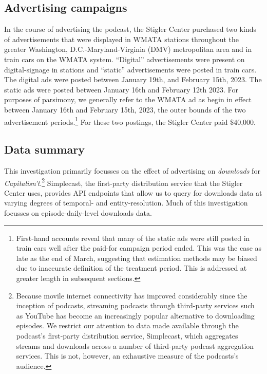 \documentclass[11pt, letterpaper, twoside]{article}
\begin{document}
\subsection{Advertising campaigns}
In the course of advertising the podcast, the Stigler Center purchased two kinds of advertisements that were displayed in WMATA stations throughout the greater Washington, D.C.-Maryland-Virginia (DMV) metropolitan area and in train cars on the WMATA system. ``Digital'' advertisements were present on digital-signage in stations and ``static'' advertisements were posted in train cars. The digital ads were posted between January 19th, and February 15th, 2023. The static ads were posted between January 16th and February 12th 2023. For purposes of parsimony, we generally refer to the WMATA ad as begin in effect between January 16th and February 15th, 2023, the outer bounds of the two advertisement periods.\footnote{First-hand accounts reveal that many of the static ads were still posted in train cars well after the paid-for campaign period ended. This was the case as late as the end of March, suggesting that estimation methods may be biased due to inaccurate definition of the treatment period. This is addressed at greater length in subsequent sections.} For these two postings, the Stigler Center paid \$40,000.

\subsection{Data summary}
This investigation primarily focusses on the effect of advertising on \textit{downloads} for \textit{Capitalisn't}.\footnote{Because movile internet connectivity has improved considerably since the inception of podcasts, streaming podcasts through third-party services such as YouTube has become an increasingly popular alternative to downloading episodes. We restrict our attention to data made available through the podcast's first-party distribution service, Simplecast, which aggregates streams and downloads across a number of third-party podcast aggregation services. This is not, however, an exhaustive measure of the podcasts's audience.} Simplecast, the first-party distribution service that the Stigler Center uses, provides API endpoints that allow us to query for downloads data at varying degrees of temporal- and entity-resolution. Much of this investigation focusses on episode-daily-level downloads data.\\
\end{document}
